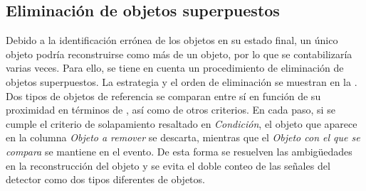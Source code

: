 \subsection{Eliminación de objetos superpuestos}
\label{subsec:evt_selection:presel:or}

Debido a la identificación errónea de los objetos en su estado final, un único objeto podría reconstruirse como más de un objeto, por lo que se contabilizaría varias veces. Para ello, se tiene en cuenta un procedimiento de eliminación de objetos superpuestos. La estrategia y el orden de eliminación se muestran en la \Tab{\ref{tab:evt_selection:presel:or}}. Dos tipos de objetos de referencia se comparan entre sí en función de su proximidad en términos de \DeltaR, así como de otros criterios. En cada paso, si se cumple el criterio de solapamiento resaltado en \textit{Condición}, el objeto que aparece en la columna \textit{Objeto a remover} se descarta, mientras que el \textit{Objeto con el que se compara} se mantiene en el evento. De esta forma se resuelven las ambigüedades en la reconstrucción del objeto y se evita el doble conteo de las señales del detector como dos tipos diferentes de objetos.

\begin{table}[ht!]
    \centering
    \caption{Pasos para la eliminación de objetos superpuestos.}
    \label{tab:evt_selection:presel:or}
\end{table}










